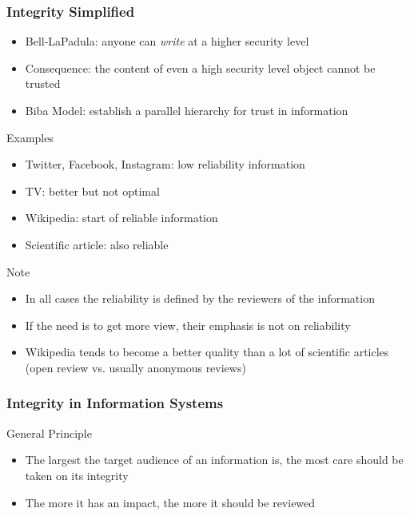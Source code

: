 \begin{reveals}
\begin{frame}
\end{frame}


\begin{frame}
  \frametitle{Integrity Simplified}
  
  \begin{block}{}
    \begin{itemize}
    \item Bell-LaPadula: anyone can \emph{write} at a higher security level
    \item Consequence: the content of even a high security level object cannot be trusted
    \item Biba Model: establish a parallel hierarchy for trust in information
    \end{itemize}
  \end{block}

  \begin{block} {Examples}
    \begin{itemize}
    \item Twitter, Facebook, Instagram: low reliability information
    \item TV: better but not optimal
    \item Wikipedia: start of reliable information
    \item Scientific article: also reliable
    \end{itemize}
  \end{block}

  \begin{block}{Note}
    \begin{itemize}
    \item In all cases the reliability is defined by the reviewers of the information
    \item If the need is to get more view, their emphasis is not on reliability
    \item Wikipedia tends to become a better quality than a lot of
      scientific articles (open review vs. usually anonymous reviews)
    \end{itemize}
  \end{block}


\end{frame}

\begin{frame}
  \frametitle{Integrity in Information Systems}

  \vfill

  \begin{block}{General Principle}
    \begin{itemize}
    \item The largest the target audience of an information is, the
      most care should be taken on its integrity
    \item The more it has an impact, the more it should be reviewed
    \end{itemize}
  \end{block}


\end{frame}
\end{reveals}
